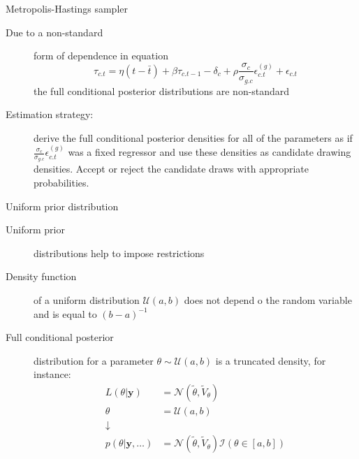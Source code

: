 \documentclass[notes,blackandwhite,mathsans,usenames,dvipsnames]{beamer}
\begin{document}
\begin{frame}{Metropolis-Hastings sampler}

\begin{description}
\item[Due to a non-standard] form of dependence in equation
$$ \tau_{c.t} = \eta (t-\bar{t}) + \beta \tau_{c.t-1} - \delta_{c} + \rho\frac{\sigma_c}{\sigma_{g.c}}\epsilon_{c.t}^{(g)}   + \epsilon_{c.t} $$
the full conditional posterior distributions are non-standard 

\smallskip\item[Estimation strategy:] derive the full conditional posterior densities for all of the parameters as if $\frac{\sigma_c}{\sigma_{g.c}}\epsilon_{c.t}^{(g)}$ was a fixed regressor and use these densities as candidate drawing densities. Accept or reject the candidate draws with appropriate probabilities.

\end{description}

\end{frame}




\begin{frame}{Uniform prior distribution}

\begin{description}
\item[Uniform prior] distributions help to impose restrictions
\item[Density function] of a uniform distribution $\mathcal{U}(a,b)$ does not depend o the random variable and is equal to $(b-a)^{-1}$
\item[Full conditional posterior] distribution for a parameter $\theta\sim\mathcal{U}(a,b)$ is a truncated density, for instance:
\begin{align*}
L(\theta|\mathbf{y}) &= \mathcal{N}(\tilde{\theta},\tilde{V}_\theta)\\
\theta &= \mathcal{U}(a,b)\\
\downarrow&\\
p(\theta|\mathbf{y},\dots) &= \mathcal{N}(\tilde{\theta},\tilde{V}_\theta)\mathcal{I}(\theta\in[a,b])
\end{align*}
\end{description}

\end{frame}
\end{document}
